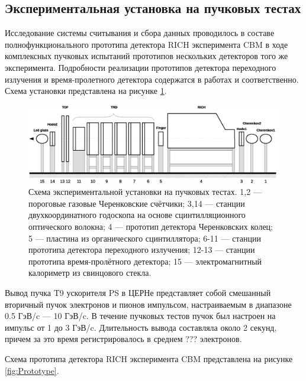 \subsection{Экспериментальная установка на пучковых тестах}

Исследование системы считывания и сбора данных проводилось в составе полнофункционального прототипа детектора RICH эксперимента CBM в ходе комплексных пучковых испытаний прототипов нескольких детекторов того же эксперимента. Подробности реализации прототипов детектора переходного излучения и время-пролетного детектора содержатся в работах \cite{} и \cite{} соответственно. Схема установки представлена на рисунке \ref{fig:Beamtime}.

\begin{figure}
\includegraphics[width=1.0\textwidth]{pictures/9_Beamtime_setup_Full.eps}
\caption{Схема экспериментальной установки на пучковых тестах. 1,2 --- пороговые газовые Черенковские счётчики; 3,14 --- станции двухкоординатного годоскопа на основе сцинтилляционного оптического волокна; 4 --- прототип детектора Черенковских колец; 5 --- пластина из органического сцинтиллятора; 6-11 --- станции прототипа детектора переходного излучения; 12-13 --- станции прототипа время-пролётного детектора; 15 --- электромагнитный калориметр из свинцового стекла.}
\label{fig:Beamtime}
\end{figure}

Вывод пучка T9 ускорителя PS \cite{} в ЦЕРНе представляет собой смешанный вторичный пучок электронов и пионов импульсом, настраиваемым в диапазоне 0.5 ГэВ/c --- 10 ГэВ/c. В течение пучковых тестов пучок был настроен на импульс от 1 до 3 ГэВ/c. Длительность вывода составляла около 2 секунд, причем за это время регистрировалось в среднем ??? электронов.

Схема прототипа детектора RICH эксперимента CBM представлена на рисунке \ref{fig:Prototype}.

